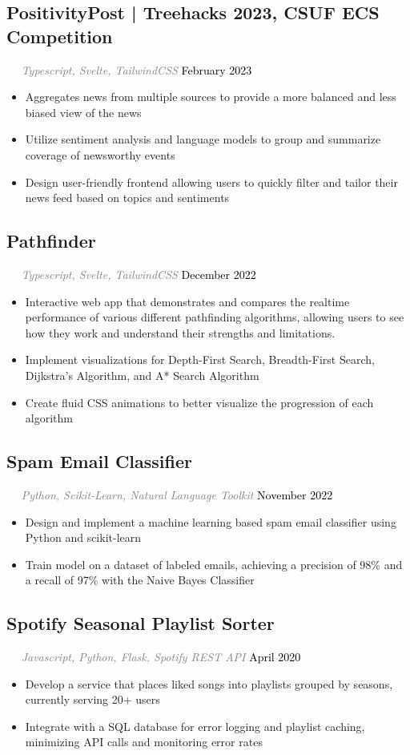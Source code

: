 \documentclass{article}
\newcommand{\resumesection}[3]{
    \subsection*{#1}
    \ 
    \ 
    \small
    \textcolor{grey}{\emph{#2}}
    \normalsize
    \hfill
    \textcolor{black}{#3}
    \normalsize
}
\begin{document}
\resumesection{PositivityPost | Treehacks 2023, CSUF ECS Competition}{Typescript, Svelte, TailwindCSS}{February 2023}
\begin{itemize}
    \item Aggregates news from multiple sources to provide a more balanced and less biased view of the news
    \item Utilize sentiment analysis and language models to group and summarize coverage of newsworthy events
    \item Design user-friendly frontend allowing users to quickly filter and tailor their news feed based on topics and sentiments
\end{itemize}
\resumesection{Pathfinder}{Typescript, Svelte, TailwindCSS}{December 2022}
\begin{itemize}
    \item Interactive web app that demonstrates and compares the realtime performance of various different pathfinding algorithms, allowing users to see how they work and understand their strengths and limitations.
    \item Implement visualizations for Depth-First Search, Breadth-First Search, Dijkstra's Algorithm, and A* Search Algorithm
    \item Create fluid CSS animations to better visualize the progression of each algorithm
\end{itemize}

\resumesection{Spam Email Classifier}{Python, Scikit-Learn, Natural Language Toolkit}{November 2022}
\begin{itemize}
    \item Design and implement a machine learning based spam email classifier using Python and scikit-learn
    \item Train model on a dataset of labeled emails, achieving a precision of 98\% and a recall of 97\% with the Naive Bayes Classifier
\end{itemize}

\resumesection{Spotify Seasonal Playlist Sorter}{Javascript, Python, Flask, Spotify REST API}{April 2020}
\begin{itemize}
    \item Develop a service that places liked songs into playlists grouped by seasons, currently serving 20+ users
    \item Integrate with a SQL database for error logging and playlist caching, minimizing API calls and monitoring error rates
\end{itemize}
\end{document}
